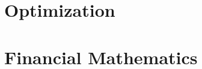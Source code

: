 \documentclass{book}
\theoremstyle{plain}
\theoremstyle{definition}
\numberwithin{equation}{section}
\begin{document}
\part{Optimization}

\part{Financial Mathematics}

%


%








%
%

%
\end{document}
